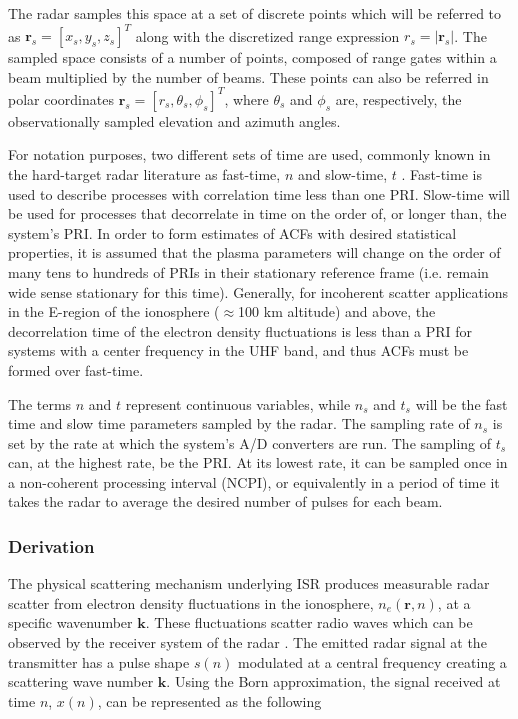 The radar samples this space at a set of discrete points which will be referred to as $\mathbf{r}_s = [x_s,y_s,z_s]^T$ along with the discretized range expression $r_s=|\mathbf{r}_s|$. The sampled space consists of a number of points, composed of range gates within a beam multiplied by the number of beams. These points can also be referred in polar coordinates $\mathbf{r}_s = [r_s,\theta_s,\phi_s]^T$, where $\theta_s$  and $\phi_s$ are, respectively, the observationally sampled elevation and azimuth angles.

For notation purposes, two different sets of time are used, commonly known in the hard-target radar literature as fast-time, $n$ and slow-time, $t$ \cite{richards:fundamentalsigproc}. Fast-time is used to describe processes with correlation time less than one PRI. Slow-time will be used for processes that decorrelate in time on the order of, or longer than, the system's PRI. In order to form estimates of ACFs with desired statistical properties, it is assumed that the plasma parameters will change on the order of many tens to hundreds of PRIs in their stationary reference frame (i.e. remain wide sense stationary for this time). Generally, for incoherent scatter applications in the E-region of the ionosphere ($\approx$100 km altitude) and above, the decorrelation time of the electron density fluctuations is less than a PRI for systems with a center frequency in the UHF band, and thus ACFs must be formed over fast-time.

The terms $n$ and $t$ represent continuous variables, while $n_s$ and $t_s$ will be the fast time and slow time parameters sampled by the radar. The sampling rate of $n_s$ is set by the rate at which the system's A/D converters are run. The sampling of $t_s$ can, at the highest rate, be the PRI. At its lowest rate, it can be sampled once in a non-coherent processing interval (NCPI), or equivalently in a period of time it takes the radar to average the desired number of pulses for each beam. 

\subsubsection{Derivation}

The physical scattering mechanism underlying ISR produces measurable radar scatter from electron density fluctuations in the ionosphere, $n_e(\mathbf{r},n)$, at a specific wavenumber $\mathbf{k}$. These fluctuations scatter radio waves which can be observed by the receiver system of the radar \cite{dougherty:farley1960}. The emitted radar signal at the transmitter has a pulse shape $s(n)$ modulated at a central frequency creating a scattering wave number $\mathbf{k}$. Using the Born approximation, the signal received at time $n$, $x(n)$, can be represented as the following

